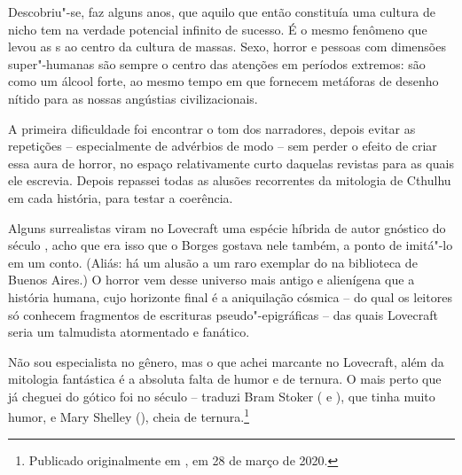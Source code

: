 \begin{changemargin}
Descobriu"-se, faz alguns anos, que aquilo que então constituía uma cultura de nicho tem na verdade potencial infinito de sucesso. É o mesmo fenômeno que levou as s ao centro da cultura de massas. Sexo, horror e pessoas com dimensões super"-humanas são sempre o centro das atenções em períodos extremos: são como um álcool forte, ao mesmo tempo em que fornecem metáforas de desenho nítido para as nossas angústias civilizacionais. 

\bigskip
\bigskip
\pagebreak


\bigskip


A primeira dificuldade foi encontrar o tom dos narradores, depois evitar as repetições – especialmente de advérbios de modo – sem perder o efeito de criar essa aura de horror, no espaço relativamente curto daquelas revistas para as quais ele escrevia. Depois repassei todas as alusões recorrentes da mitologia de Cthulhu em cada história, para testar a coerência.

\bigskip


Alguns surrealistas viram no Lovecraft uma espécie híbrida de autor gnóstico do século , acho que era isso que o Borges gostava nele também, a ponto de imitá"-lo em um conto. (Aliás: há um alusão a um raro exemplar do {} na biblioteca de Buenos Aires.) O horror vem desse universo mais antigo e alienígena que a história humana, cujo horizonte final é a aniquilação cósmica – do qual os leitores só conhecem fragmentos de escrituras pseudo"-epigráficas – das quais Lovecraft seria um talmudista atormentado e fanático.

\bigskip


Não sou especialista no gênero, mas o que achei marcante no Lovecraft, além da mitologia fantástica é a absoluta falta de humor e de ternura. O mais perto que já cheguei do gótico foi no século  – traduzi Bram Stoker ({} e {}), que tinha muito humor, e Mary Shelley ({}), cheia de ternura.\footnote{Publicado originalmente em {}, em 28 de março de 2020.}

\pagebreak

\end{changemargin}

